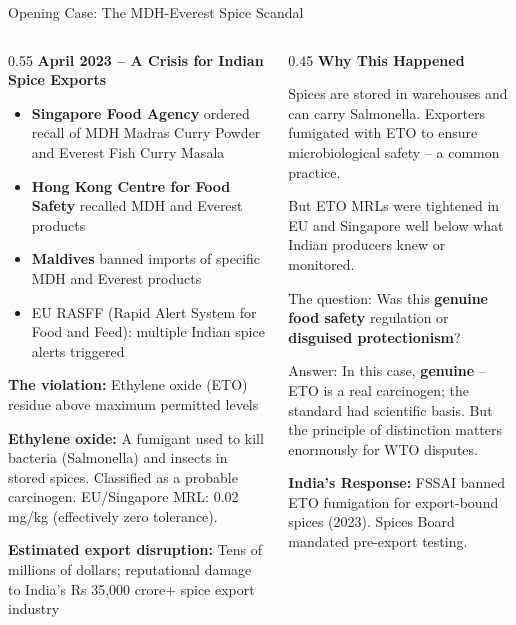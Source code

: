 \documentclass[
  ignorenonframetext,
  aspectratio=169,
]{beamer}
\makeatletter
\providecommand{\tightlist}{%
  \setlength{\itemsep}{0pt}\setlength{\parskip}{0pt}}
\let\quarto@originallabel\label
\DeclareRobustCommand*{\label}[1]{\quarto@originallabel{#1}}
\makeatother
\begin{document}
\begin{frame}{Opening Case: The MDH-Everest Spice Scandal}
\label{opening-case-the-mdh-everest-spice-scandal}
\begin{columns}[T]
\begin{column}{0.55\linewidth}
\textbf{April 2023 -- A Crisis for Indian Spice Exports}

\begin{itemize}
\tightlist
\item
  \textbf{Singapore Food Agency} ordered recall of MDH Madras Curry
  Powder and Everest Fish Curry Masala
\item
  \textbf{Hong Kong Centre for Food Safety} recalled MDH and Everest
  products
\item
  \textbf{Maldives} banned imports of specific MDH and Everest products
\item
  EU RASFF (Rapid Alert System for Food and Feed): multiple Indian spice
  alerts triggered
\end{itemize}

\textbf{The violation:} Ethylene oxide (ETO) residue above maximum
permitted levels

\textbf{Ethylene oxide:} A fumigant used to kill bacteria (Salmonella)
and insects in stored spices. Classified as a probable carcinogen.
EU/Singapore MRL: 0.02 mg/kg (effectively zero tolerance).

\textbf{Estimated export disruption:} Tens of millions of dollars;
reputational damage to India's Rs 35,000 crore+ spice export industry
\end{column}

\begin{column}{0.45\linewidth}
\textbf{Why This Happened}

Spices are stored in warehouses and can carry Salmonella. Exporters
fumigated with ETO to ensure microbiological safety -- a common
practice.

But ETO MRLs were tightened in EU and Singapore well below what Indian
producers knew or monitored.

The question: Was this \textbf{genuine food safety} regulation or
\textbf{disguised protectionism}?

Answer: In this case, \textbf{genuine} -- ETO is a real carcinogen; the
standard had scientific basis. But the principle of distinction matters
enormously for WTO disputes.

\textbf{India's Response:} FSSAI banned ETO fumigation for export-bound
spices (2023). Spices Board mandated pre-export testing.
\end{column}
\end{columns}
\end{frame}
\end{document}
